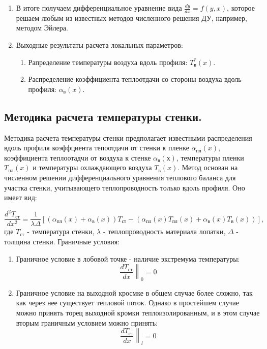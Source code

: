 \documentclass[a4paper,10pt]{article}
\begin{document}
\begin{enumerate}
        \item В итоге получаем дифференциальное уравнение вида $\frac{dy}{dx} = f(y, x)$, которое решаем любым из
        известных методов численного решения ДУ, например, методом Эйлера.

        \item Выходные результаты расчета локальных параметров:

        \begin{enumerate}
            \item Рапределение температуры воздуха вдоль профиля: $T_в^*(x)$.
            \item Распределение коэффициента теплоотдачи со стороны воздуха вдоль профиля: $\alpha_в (x)$.
        \end{enumerate}

    \end{enumerate}

%    

    \subsection{Методика расчета температуры стенки.}
    
    Методика расчета температуры стенки предполагает известными распределения вдоль профиля коэффциента
    тепоотдачи от стенки к пленке $\alpha_{пл}(x)$, коэффициента теплоотадчи от воздуха к стенке $\alpha_в(х)$,
    температуры пленки $T_{пл}(x)$ и температуры охлаждающего воздуха $T_в(x)$.
    Метод основан на численном решении дифференциального уравнения теплового баланса для участка стенки,
    учитывающего теплопроводность только вдоль профиля.
    Оно имеет вид:

    \[
        \frac{d^2 T_{ст}}{dx^2} = \frac{1}{\lambda \Delta} \left[
                    \left( \alpha_{пл}(x) + \alpha_в(x) \right) T_{ст} -
                    \left( \alpha_{пл}(x) T_{пл}(x) + \alpha_в(x) T_в(x) \right)
        \right],
    \]
    где $T_{ст}$ - температура стенки, $\lambda$ - теплопроводность материала лопатки, $\Delta$ - толщина стенки.
    Граничные условия:

    \begin{enumerate}
        \item Граничное условие в лобовой точке - наличие экстремума температуры:
        \[
            \left. \frac{dT_{ст}}{dx} \right\|_0 = 0
        \]

        \item Граничное условие на выходной кросмке в общем случае более сложно, так как через нее
        существует тепловой поток. Однако в простейшем случае можно принять торец выходной кромки теплоизолированным,
        и в этом случае вторым граничным условием можно принять:
        \[
            \left. \frac{dT_{ст}}{dx} \right\|_l = 0
        \]
    \end{enumerate}
\end{document}
